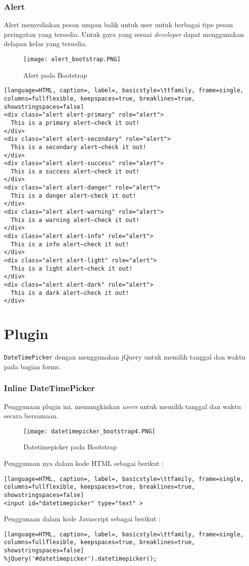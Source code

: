 \subsubsection{Alert}
Alert menyediakan pesan umpan balik untuk user untuk berbagai tipe pesan peringatan yang tersedia. Untuk gaya yang sesuai \textit{developer} dapat menggunakan delapan kelas yang tersedia.
\begin{figure} [H]
	\centering  
	\texttt{[image: alert\_bootstrap.PNG]}  
	\caption{Alert pada Bootstrap} 
\end{figure}
\begin{lstlisting}[language=HTML, caption=, label=, basicstyle=\ttfamily, frame=single, columns=fullflexible, keepspaces=true, breaklines=true, showstringspaces=false] 
<div class="alert alert-primary" role="alert">
  This is a primary alert—check it out!
</div>
<div class="alert alert-secondary" role="alert">
  This is a secondary alert—check it out!
</div>
<div class="alert alert-success" role="alert">
  This is a success alert—check it out!
</div>
<div class="alert alert-danger" role="alert">
  This is a danger alert—check it out!
</div>
<div class="alert alert-warning" role="alert">
  This is a warning alert—check it out!
</div>
<div class="alert alert-info" role="alert">
  This is a info alert—check it out!
</div>
<div class="alert alert-light" role="alert">
  This is a light alert—check it out!
</div>
<div class="alert alert-dark" role="alert">
  This is a dark alert—check it out!
</div>
\end{lstlisting}

\section{Plugin}
\texttt{DateTimePicker} dengan menggunakan jQuery untuk memilih tanggal dan waktu pada bagian forms. 
\subsubsection{Inline DateTimePicker}
Penggunaan plugin ini, memungkinkan \textit{users} untuk memilih tanggal dan waktu secara bersamaan.
\begin{figure} [H]
	\centering  
	\texttt{[image: datetimepicker\_bootstrap4.PNG]}  
	\caption{Datetimepicker pada Bootstrap} 
\end{figure}
\noindent 
Penggunaan nya dalam kode HTML sebagai berikut :
\begin{lstlisting}[language=HTML, caption=, label=, basicstyle=\ttfamily, frame=single, columns=fullflexible, keepspaces=true, breaklines=true, showstringspaces=false] 
<input id="datetimepicker" type="text" >
\end{lstlisting}

Penggunaan dalam kode Javascript sebagai berikut :

\begin{lstlisting}[language=HTML, caption=, label=, basicstyle=\ttfamily, frame=single, columns=fullflexible, keepspaces=true, breaklines=true, showstringspaces=false] 
%jQuery('#datetimepicker').datetimepicker();
\end{lstlisting}

 

 

